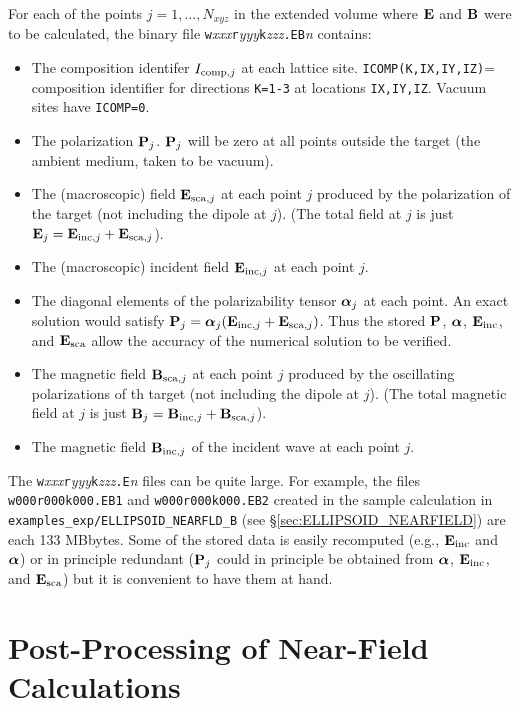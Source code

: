 For each of the points $j=1,...,N_{xyz}$ in the extended volume where
${\bf E}$ and ${\bf B}$ were to be calculated, the binary file 
{\tt w}{\it xxx}{\tt r}{\it yyy}{\tt k}{\it zzz}{\tt .EB}{\it n}
contains:
\begin{itemize}
\item The composition identifer $I_{{\rm comp},j}$ at each lattice site.
      {\tt ICOMP(K,IX,IY,IZ)}= composition identifier for directions 
      {\tt K=1-3} at locations {\tt IX,IY,IZ}.
      Vacuum sites have {\tt ICOMP=0}.
\item The polarization ${\bf P}_j$.  ${\bf P}_j$ will be zero at all points
      outside the target (the ambient medium, taken to be vacuum).
\item The (macroscopic) field ${\bf E}_{{\rm sca},j}$ at each point $j$ 
      produced by the polarization of
      the target (not including the dipole at $j$).
      (The total field at $j$ is just 
      ${\bf E}_j={\bf E}_{{\rm inc},j}+{\bf E}_{{\rm sca},j}$).
\item The (macroscopic) incident field ${\bf E}_{{\rm inc},j}$ at each point $j$.
\item The diagonal elements of the polarizability tensor ${\boldsymbol{\alpha}}_j$
      at each point.  An exact solution would satisfy
      ${\bf P}_j={\boldsymbol{\alpha}}_j({\bf E}_{{\rm inc},j}+{\bf E}_{{\rm sca},j})$.
      Thus the stored ${\bf P}$, ${\boldsymbol{\alpha}}$, ${\bf E}_{\rm inc}$, and ${\bf E}_{\rm sca}$ allow
      the accuracy of the numerical solution to be verified.
\item The magnetic field ${\bf B}_{{\rm sca},j}$ at each point $j$
      produced by the oscillating polarizations of th target (not including
      the dipole at $j$).
      (The total magnetic field at $j$ is just
      ${\bf B}_j={\bf B}_{{\rm inc},j}+{\bf B}_{{\rm sca},j}$).
\item The magnetic field ${\bf B}_{{\rm inc},j}$ of the incident wave at each point $j$.
\end{itemize}
The {\tt w}{\it xxx}{\tt r}{\it yyy}{\tt k}{\it zzz}{\tt .E}{\it n}
files can be quite large.
For example, the files {\tt w000r000k000.EB1} and {\tt w000r000k000.EB2}
created in the sample calculation in {\tt examples\_exp/ELLIPSOID\_NEARFLD\_B}
(see \S\ref{sec:ELLIPSOID_NEARFIELD}) are each 133 MBbytes.
Some of the stored data is easily recomputed (e.g., ${\bf E}_{\rm inc}$ and
${\boldsymbol{\alpha}}$) or
in principle redundant (${\bf P}_j$ could in principle be obtained from
${\boldsymbol{\alpha}}$, ${\bf E}_{\rm inc}$, and ${\bf E}_{\rm sca}$) but it is convenient to have
them at hand.

\section{Post-Processing of Near-Field Calculations
         \label{sec:postprocessing}}

